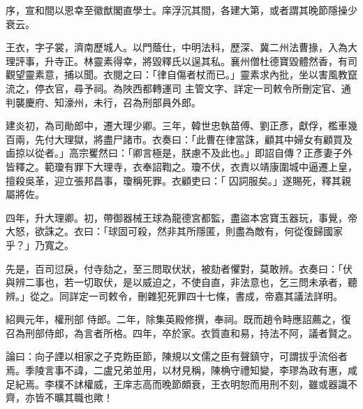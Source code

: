 \begin{pinyinscope}
 序，宣和間以恩幸至徽猷閣直學士。庠浮沉其間，各建大第，或者謂其晚節隱操少衰云。



 王衣，字子裳，濟南歷城人。以門蔭仕，中明法科，歷深、冀二州法曹掾，入為大理評事，升寺正。林靈素得幸，將毀釋氏以逞其私。襄州僧杜德寶毀體然香，有司觀望靈素意，捕以聞。衣閱之曰：「律自傷者杖而已。」靈素求內批，坐以害風教竄流之，停衣官，尋予祠。為陜西都轉運司
 主管文字、詳定一司敕令所刪定官、通判襲慶府、知濠州，未行，召為刑部員外郎。



 建炎初，為司勛郎中，遷大理少卿。三年，韓世忠執苗傅、劉正彥，獻俘，檻車幾百兩，先付大理獄，將盡尸諸市。衣奏曰：「此曹在律當誅，顧其中婦女有顧買及鹵掠以從者。」高宗矍然曰：「卿言極是，朕慮不及此也。」即詔自傳？正彥妻子外皆釋之。範瓊有罪下大理寺，衣奉詔鞫之。瓊不伏，衣責以靖康圍城中逼遷上皇，擅殺吳革，迎立張邦昌事，瓊稱死罪。衣顧吏曰：「
 囚詞服矣。」遂賜死，釋其親屬將佐。



 四年，升大理卿。初，帶御器械王球為龍德宮都監，盡盜本宮寶玉器玩，事覺，帝大怒，欲誅之。衣曰：「球固可殺，然非其所隱匿，則盡為敵有，何從復歸國家乎？」乃寬之。



 先是，百司愆戾，付寺劾之，至三問取伏狀，被劾者懼對，莫敢辨。衣奏曰：「伏與辨二事也，若一切取伏，是以威迫之，不使自直，非法意也，乞三問未承者，聽辨。」從之。同詳定一司敕令，刪雜犯死罪四十七條，書成，帝嘉其議法詳明。



 紹興元年，權刑部
 侍郎。二年，除集英殿修撰，奉祠。既而趙令畤應詔薦之，復召為刑部侍郎，為言者所格。四年，卒於家。衣質直和易，持法不阿，議者賢之。



 論曰：向子諲以相家之子克飭臣節，陳規以文儒之臣有聲鎮守，可謂拔乎流俗者焉。季陵言事不諱，二盧兄弟並用，以材見稱，陳桷守禮知變，李璆為政有惠，咸足紀焉。李樸不訹權威，王庠志高而晚節頗衰，王衣明恕而用刑不刻，雖或器識不齊，亦皆不曠其職也歟！



\end{pinyinscope}